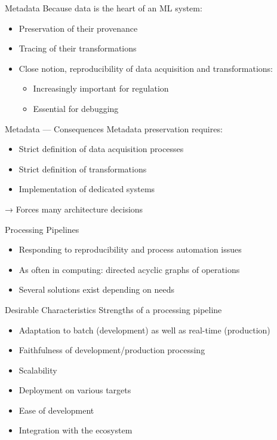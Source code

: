 \begin{frame}{Metadata}
  Because data is the heart of an ML system:
  \begin{itemize}
    \item Preservation of their provenance
    \item Tracing of their transformations
    \item Close notion, reproducibility of data acquisition and transformations:
      \begin{itemize}
        \item Increasingly important for regulation
        \item Essential for debugging
      \end{itemize}
  \end{itemize}
\end{frame}

\begin{frame}{Metadata — Consequences}
  Metadata preservation requires:
  
  \begin{itemize}
    \item Strict definition of data acquisition processes
    \item Strict definition of transformations
    \item Implementation of dedicated systems
  \end{itemize}
  
  → Forces many architecture decisions
\end{frame}

\begin{frame}{Processing Pipelines}
  \begin{itemize}
    \item Responding to reproducibility and process automation issues
    \item As often in computing: directed acyclic graphs of operations
    \item Several solutions exist depending on needs
  \end{itemize}
\end{frame}

\begin{frame}{Desirable Characteristics}
  Strengths of a processing pipeline
  \begin{itemize}
    \item Adaptation to batch (development) as well as real-time (production)
    \item Faithfulness of development/production processing
    \item Scalability
    \item Deployment on various targets
    \item Ease of development
    \item Integration with the ecosystem
  \end{itemize}
\end{frame}

